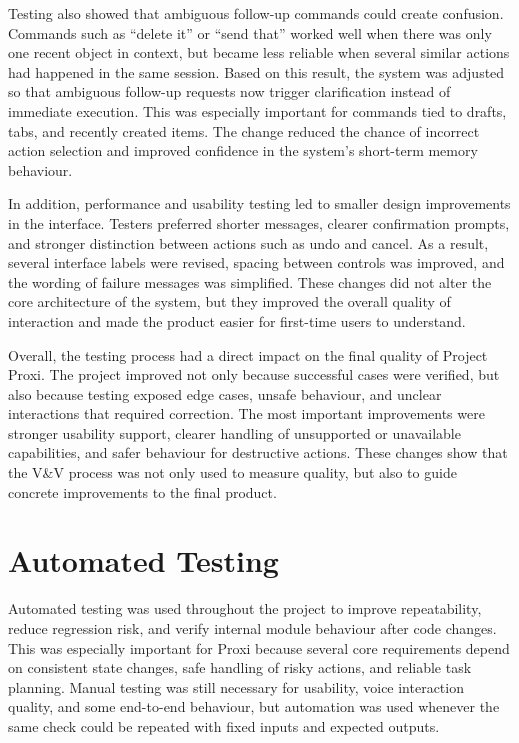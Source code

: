 \documentclass[12pt]{article}
\begin{document}
Testing also showed that ambiguous follow-up commands could create
confusion. Commands such as ``delete it'' or ``send that'' worked well
when there was only one recent object in context, but became less
reliable when several similar actions had happened in the same session.
Based on this result, the system was adjusted so that ambiguous
follow-up requests now trigger clarification instead of immediate
execution. This was especially important for commands tied to drafts,
tabs, and recently created items. The change reduced the chance of
incorrect action selection and improved confidence in the system's
short-term memory behaviour.

In addition, performance and usability testing led to smaller design
improvements in the interface. Testers preferred shorter messages,
clearer confirmation prompts, and stronger distinction between actions
such as undo and cancel. As a result, several interface labels were
revised, spacing between controls was improved, and the wording of
failure messages was simplified. These changes did not alter the core
architecture of the system, but they improved the overall quality of
interaction and made the product easier for first-time users to
understand.

Overall, the testing process had a direct impact on the final quality
of Project Proxi. The project improved not only because successful
cases were verified, but also because testing exposed edge cases,
unsafe behaviour, and unclear interactions that required correction.
The most important improvements were stronger usability support,
clearer handling of unsupported or unavailable capabilities, and safer
behaviour for destructive actions. These changes show that the V\&V
process was not only used to measure quality, but also to guide
concrete improvements to the final product.

\section{Automated Testing}

Automated testing was used throughout the project to improve
repeatability, reduce regression risk, and verify internal module
behaviour after code changes. This was especially important for Proxi
because several core requirements depend on consistent state changes,
safe handling of risky actions, and reliable task planning. Manual
testing was still necessary for usability, voice interaction quality,
and some end-to-end behaviour, but automation was used whenever the
same check could be repeated with fixed inputs and expected outputs.
\end{document}
